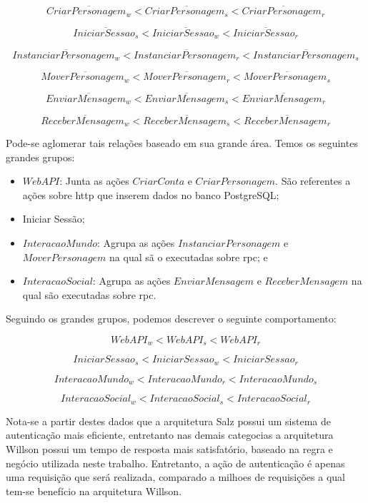 $$
  \overline{CriarPersonagem_{w}} < \overline{CriarPersonagem_{s}} <\overline{CriarPersonagem_{r}}
$$

$$
  \overline{IniciarSessao_{s}} < \overline{IniciarSessao_{w}} <\overline{IniciarSessao_{r}}
$$

$$
  \overline{InstanciarPersonagem_{w}} < \overline{InstanciarPersonagem_{r}} <\overline{InstanciarPersonagem_{s}}
$$

$$
  \overline{MoverPersonagem_{w}} < \overline{MoverPersonagem_{r}} <\overline{MoverPersonagem_{s}}
$$

$$
  \overline{EnviarMensagem_{w}} < \overline{EnviarMensagem_{s}} <\overline{EnviarMensagem_{r}}
$$

$$
  \overline{ReceberMensagem_{w}} < \overline{ReceberMensagem_{s}} <\overline{ReceberMensagem_{r}}
$$

Pode-se aglomerar tais relações baseado em sua grande área.
%
Temos os seguintes grandes grupos:

\begin{itemize}
 \item $WebAPI$: Junta as ações $CriarConta$ e $CriarPersonagem$. São referentes a ações sobre \ac{http} que inserem dados no banco PostgreSQL;
  \item Iniciar Sessão;
  \item $InteracaoMundo$: Agrupa as ações $InstanciarPersonagem$ e $MoverPersonagem$ na qual sã o executadas sobre \ac{rpc}; e
  \item $InteracaoSocial$: Agrupa as ações $EnviarMensagem$ e $ReceberMensagem$ na qual são executadas sobre \ac{rpc}.
\end{itemize}

Seguindo os grandes grupos, podemos descrever o seguinte comportamento:

$$
WebAPI_{w} < WebAPI_{s} < WebAPI_{r}
$$

$$
  IniciarSessao_{s} < IniciarSessao_{w} <IniciarSessao_{r}
$$

$$
InteracaoMundo_{w} < InteracaoMundo_{r} < InteracaoMundo_{s}
$$

$$
InteracaoSocial_{w} < InteracaoSocial_{s} < InteracaoSocial_{r}
$$

Nota-se a partir destes dados que a arquitetura Salz possui um sistema de autenticação mais eficiente, entretanto nas demais categocias a arquitetura Willson possui um tempo de resposta mais satisfatório, baseado na regra e negócio utilizada neste trabalho.
%
Entretanto, a ação de autenticação é apenas uma requisição que será realizada, comparado a milhoes de requisições a qual tem-se benefício na arquitetura Willson.


